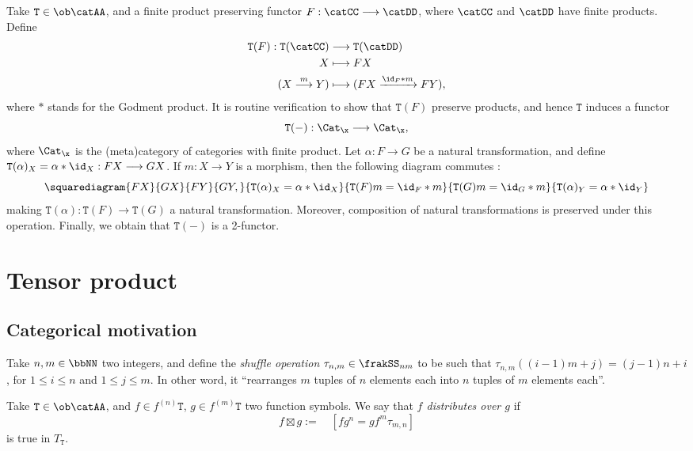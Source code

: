\documentclass[a4paper, 12pt]{article}
\newcommand{\theory}{\mathtt}
\begin{document}
Take $\theory{T} \in \ob \catAA$, and a finite product preserving functor $F : \catCC \longrightarrow \catDD$, where $\catCC$ and $\catDD$ have finite products. Define
\begin{align*}
    \theory{T} (F) : \theory{T} (\catCC) &\longrightarrow \theory{T} (\catDD) \\
    X &\longmapsto FX \\
    (X \stackrel{m}{\longrightarrow} Y) &\longmapsto (FX \xrightarrow{\id_F * m} FY) ,
\end{align*}
where $*$ stands for the Godment product. It is routine verification to show that $\theory{T} (F)$ preserve products, and hence $\theory{T}$ induces a functor
\[ \theory{T} (-) : \Cat_\x \longrightarrow \Cat_\x , \]
where $\Cat_\x$ is the (meta)category of categories with finite product. Let $\alpha : F \longrightarrow G$ be a natural transformation, and define $\theory{T} (\alpha)_X = \alpha * \id_X : FX \longrightarrow GX$. If $m : X \longrightarrow Y$ is a morphism, then the following diagram commutes : 
\[ \squarediagram{FX}{GX}{FY}{GY ,}{\theory{T} (\alpha)_X = \alpha * \id_X}{\theory{T} (F) m = \id_F * m}{\theory{T} (G) m = \id_G * m}{\theory{T} (\alpha)_Y = \alpha * \id_Y} \] 
making $\theory{T} (\alpha) : \theory{T} (F) \longrightarrow \theory{T} (G)$ a natural transformation. Moreover, composition of natural transformations is preserved under this operation. Finally, we obtain that $\theory{T} (-)$ is a 2-functor.

\section{Tensor product}

\subsection{Categorical motivation}

Take $n, m \in \bbNN$ two integers, and define the \emph{shuffle operation} $\tau_{n, m} \in \frakSS_{nm}$ to be such that $\tau_{n, m} ((i - 1) m + j) = (j - 1) n + i$, for $1 \leq i \leq n$ and $1 \leq j \leq m$. In other word, it ``rearranges $m$ tuples of $n$ elements each into $n$ tuples of $m$ elements each''.

Take $\theory{T} \in \ob \catAA$, and $f \in f^{(n)} \theory{T}$, $g \in f^{(m)} \theory{T}$ two function symbols. We say that \emph{$f$ distributes over $g$} if
\[ f \boxtimes g := \quad [f g^n = g f^m \tau_{m, n}] \]
is true in $T_\theory{T}$.
\end{document}
